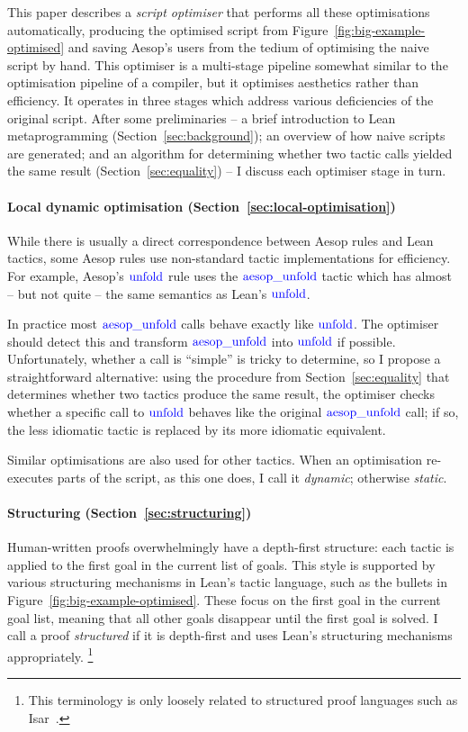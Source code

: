 \documentclass[sigplan,10pt,anonymous,review]{acmart}
\newcommand{\tac}[1]{\ensuremath{\mathrm{\mathcolor{blue}{#1}}}}
\begin{document}
This paper describes a \emph{script optimiser} that performs all these optimisations automatically, producing the optimised script from Figure~\ref{fig:big-example-optimised} and saving Aesop's users from the tedium of optimising the naive script by hand.
This optimiser is a multi-stage pipeline somewhat similar to the optimisation pipeline of a compiler, but it optimises aesthetics rather than efficiency.
It operates in three stages which address various deficiencies of the original script.
After some preliminaries -- a brief introduction to Lean metaprogramming (Section~\ref{sec:background}); an overview of how naive scripts are generated; and an algorithm for determining whether two tactic calls yielded the same result (Section~\ref{sec:equality}) -- I discuss each optimiser stage in turn.

\paragraph{Local dynamic optimisation (Section~\ref{sec:local-optimisation})}
While there is usually a direct correspondence between Aesop rules and Lean tactics, some Aesop rules use non-standard tactic implementations for efficiency.
For example, Aesop's \tac{unfold} rule uses the \tac{aesop\_unfold} tactic which has almost -- but not quite -- the same semantics as Lean's \tac{unfold}.

In practice most \tac{aesop\_unfold} calls behave exactly like \tac{unfold}.
The optimiser should detect this and transform \tac{aesop\_unfold} into \tac{unfold} if possible.
Unfortunately, whether a call is \enquote{simple} is tricky to determine, so I propose a straightforward alternative:
using the procedure from Section~\ref{sec:equality} that determines whether two tactics produce the same result, the optimiser checks whether a specific call to \tac{unfold} behaves like the original \tac{aesop\_unfold} call; if so, the less idiomatic tactic is replaced by its more idiomatic equivalent.

Similar optimisations are also used for other tactics.
When an optimisation re-executes parts of the script, as this one does, I call it \emph{dynamic}; otherwise \emph{static}.

\paragraph{Structuring (Section~\ref{sec:structuring})}
Human-written proofs overwhelmingly have a depth-first structure: each tactic is applied to the first goal in the current list of goals.
This style is supported by various structuring mechanisms in Lean's tactic language, such as the bullets in Figure~\ref{fig:big-example-optimised}.
These focus on the first goal in the current goal list, meaning that all other goals disappear until the first goal is solved.
I call a proof \emph{structured} if it is depth-first and uses Lean's structuring mechanisms appropriately.%
\footnote{This terminology is only loosely related to structured proof languages such as Isar~\cite{Isar}.}
\end{document}
